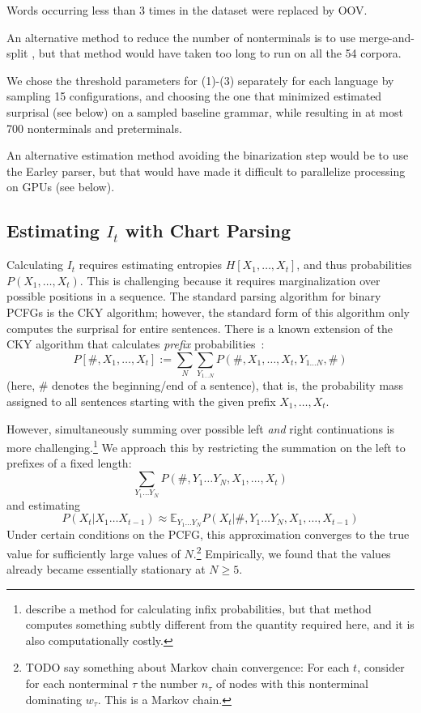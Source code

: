 \documentclass[11pt,letterpaper]{article}
\newcommand{\E}[0]{\mathbb{E}}
\begin{document}
Words occurring less than 3 times in the dataset were replaced by OOV.

An alternative method to reduce the number of nonterminals is to use merge-and-split \citep{DBLP:conf/aaai/PetrovK07}, but that method would have taken too long to run on all the 54 corpora.

We chose the threshold parameters for (1)-(3) separately for each language by sampling 15 configurations, and choosing the one that minimized estimated surprisal (see below) on a sampled baseline grammar, while resulting in at most 700 nonterminals and preterminals.

An alternative estimation method avoiding the binarization step would be to use the Earley parser, but that would have made it difficult to parallelize processing on GPUs (see below).

\subsection{Estimating $I_t$ with Chart Parsing}

Calculating $I_t$ requires estimating entropies $H[X_1, \dots, X_t]$, and thus probabilities $P(X_1, \dots, X_t)$.
This is challenging because it requires marginalization over possible positions in a sequence.
The standard parsing algorithm for binary PCFGs is the CKY algorithm; however, the standard form of this algorithm only computes the surprisal for entire sentences.
There is a known extension of the CKY algorithm that calculates \emph{prefix} probabilities~\citep{DBLP:journals/coling/JelinekL91,DBLP:journals/coling/Stolcke95,DBLP:journals/coling/Goodman99}:
\begin{equation}
P[\#, X_1, \dots, X_t] := \sum_N \sum_{Y_{1\dots N}} P(\#, X_1, \dots, X_t, Y_{1\dots N}, \#)
\end{equation}
(here, $\#$ denotes the beginning/end of a sentence), that is, the probability mass assigned to all sentences starting with the given prefix $X_1, \dots, X_t$.

However, simultaneously summing over possible left \emph{and} right continuations is more challenging.\footnote{\citet{DBLP:conf/emnlp/NederhofS11} describe a method for calculating infix probabilities, but that method computes something subtly different from the quantity required here, and it is also computationally costly.}
We approach this by restricting the summation on the left to prefixes of a fixed length:
\begin{equation}
    \sum_{Y_1\dots Y_N} P(\#, Y_1 \dots Y_N, X_1, \dots, X_t)
\end{equation}
and estimating
\begin{equation}
    P(X_t|X_1\dots X_{t-1}) \approx \E_{Y_1\dots Y_N} P(X_t|\#, Y_1 \dots Y_N, X_1, \dots, X_{t-1})
\end{equation}
Under certain conditions on the PCFG, this approximation converges to the true value for sufficiently large values of $N$.\footnote{TODO say something about Markov chain convergence: For each $t$, consider for each nonterminal $\tau$ the number $n_\tau$ of nodes with this nonterminal dominating $w_\tau$. This is a Markov chain.}
Empirically, we found that the values already became essentially stationary at $N\geq 5$.
\end{document}
